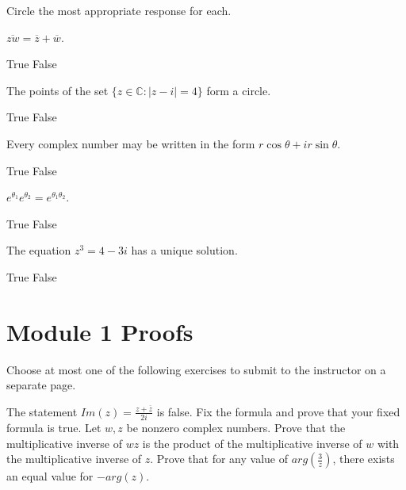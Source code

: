 \documentclass[12pt]{exam}
\begin{document}
Circle the most appropriate response for each.

\begin{questions}

\setcounter{question}{5}

\question \(\overline{zw}=\overline{z}+\overline{w}\). 
\begin{choices}
\choice True
\choice False
\end{choices}

\question The points of the set \(\{z\in\mathbb C:|z-i|=4\}\) form a circle. 
\begin{choices}
\choice True
\choice False
\end{choices}

\question Every complex number may be written in the form \(r\cos\theta+ir\sin\theta\). 
\begin{choices}
\choice True
\choice False
\end{choices}

\question \(e^{\theta_1}e^{\theta_2}=e^{\theta_1\theta_2}\). 
\begin{choices}
\choice True
\choice False
\end{choices}

\question The equation \(z^3=4-3i\) has a unique solution. 
\begin{choices}
\choice True
\choice False
\end{choices}
\end{questions}

\section*{Module 1 Proofs}

Choose at most one of the following exercises to submit to the instructor
on a separate page.

\begin{questions}

\setcounter{question}{10}

\question The statement \(Im(z)=\frac{z+\overline{z}}{2i}\) is false. Fix the formula
  and prove that your fixed formula is true. 
\question Let \(w,z\) be nonzero complex numbers. Prove that the multiplicative inverse of
  \(wz\) is the product of the multiplicative inverse of \(w\) with the multiplicative
  inverse of \(z\).
\question Prove that for any value of \(arg(\frac{3}{z})\), there exists an equal value
  for \(-arg(z)\).

\end{questions}
\end{document}
